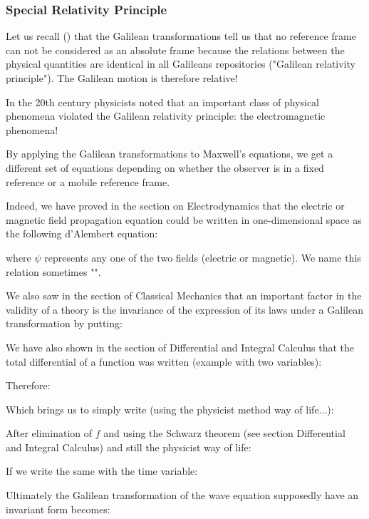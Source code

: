 	\subsubsection{Special Relativity Principle}
	Let us recall () that the Galilean transformations tell us that no reference frame can not be considered as an absolute frame because the relations between the physical quantities are identical in all Galileans repositories ("Galilean relativity principle"). The Galilean motion is therefore relative!
	
	In the 20th century physicists noted that an important class of physical phenomena violated the Galilean relativity principle: the electromagnetic phenomena!
	
	By applying the Galilean transformations to Maxwell's equations, we get a different set of equations depending on whether the observer is in a fixed reference or a mobile reference frame.
	
	Indeed, we have proved in the section on Electrodynamics that the electric or magnetic field propagation equation could be written in one-dimensional space as the following d'Alembert equation:
	
	where $\psi$ represents any one of the two fields (electric or magnetic). We name this relation sometimes "".
	
	We also saw in the section of Classical Mechanics that an important factor in the validity of a theory is the invariance of the expression of its laws under a Galilean transformation by putting:
	
	We have also shown in the section of Differential and Integral Calculus that the total differential of a function was written (example with two variables):
	
	Therefore:
	
	Which brings us to simply write (using the physicist method way of life...):
	
	After elimination of $f$ and using the Schwarz theorem (see section Differential and Integral Calculus) and still the physicist way of life:
	
	If we write the same with the time variable:
	
	Ultimately the Galilean transformation of the wave equation supposedly have an invariant form becomes:
	
